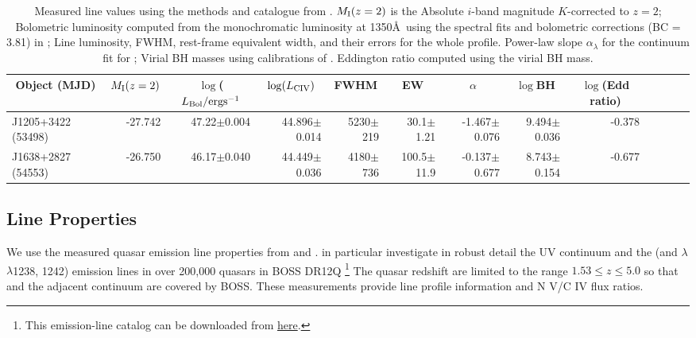\documentclass[a4paper,fleqn,usenatbib]{mnras}
\begin{document}
\begin{table*}
\begin{tabular}{ l rrr rrr rrr rrr}
\hline
\hline
  \multicolumn{1}{c}{Object (MJD)} &
  \multicolumn{1}{c}{$M_{\rm I}(z=2)$} &
  \multicolumn{1}{c}{$\log$($L_{\rm Bol} / {\rm erg s}^{-1}$} &
  \multicolumn{1}{c}{$\log(L_{\rm CIV})$} &
  \multicolumn{1}{c}{FWHM} &
  \multicolumn{1}{c}{EW} &
  \multicolumn{1}{c}{$\alpha$} &
  \multicolumn{1}{c}{$\log$BH } &
  \multicolumn{1}{c}{$\log$(Edd ratio)} \\
\hline
  J1205+3422 (53498)   & 
  -27.742                      & 47.22$\pm$0.004    &    %
44.896$\pm$0.014     &   5230$\pm$219          & 30.1$\pm$1.21        &  -1.467$\pm$0.076    &  %
  9.494$\pm$0.036    &  -0.378 \\
 J1638+2827 (54553)   & 
 -26.750                      & 46.17$\pm$0.040    & %
44.449$\pm$0.036    &  4180$\pm$736          & 100.5$\pm$11.9      & -0.137$\pm$0.677    &   %
  8.743$\pm$0.154     & -0.677  \\
\hline
\hline
\end{tabular}
 \caption{
Measured line values using the methods and catalogue from
\citet{Shen2011}.  $M_{\rm I}(z=2)$ is the Absolute $i$-band magnitude
$K$-corrected to $z = 2$; Bolometric luminosity computed from the
monochromatic luminosity at 1350\AA\ using the spectral fits and
bolometric corrections (BC = 3.81) in \citet{Richards2006b}; Line
luminosity, FWHM, rest-frame equivalent width, and their errors for
the whole \civ profile.  Power-law slope $\alpha_{\lambda}$ for the
continuum fit for \civ; Virial BH masses using calibrations of
\citet{VestergaardPeterson2006}.  Eddington ratio computed using the
virial BH mass.
}
 \label{tab:Shen11_lines}
\end{table*}


\subsection{Line Properties}  
We use the measured quasar emission line properties from
\citet{Shen2011} and \citet{Hamann2017}. \citet{Hamann2017} in
particular investigate in robust detail the UV continuum and the \civ
(and \nv $\lambda$ $\lambda$1238, 1242) emission lines in over 200,000
quasars in BOSS DR12Q \citep{Paris2017}\footnote{This emission-line
catalog can be downloaded from
\href{https://datadryad.org/stash/dataset/doi:10.6086/D1H59V}{here}.}
The quasar redshift are limited to the range $1.53 \leq z \leq 5.0$ so
that \civ and the adjacent continuum are covered by BOSS. These
measurements provide line profile information and N V/C IV flux
ratios.
\end{document}
